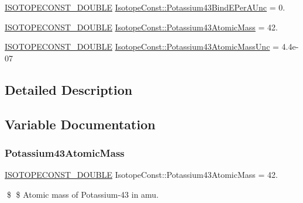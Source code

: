 \begin{DoxyCompactItemize}
\mbox{\hyperlink{group___isotope_const-_macros_ga8f45a7272ce02c0b4c65c44636ed719a}{I\+S\+O\+T\+O\+P\+E\+C\+O\+N\+S\+T\+\_\+\+D\+O\+U\+B\+LE}} \mbox{\hyperlink{group___isotope_const-_potassium-_k43_ga73a98276c2fe726e65bc5e60d863a1b0}{Isotope\+Const\+::\+Potassium43\+Bind\+E\+Per\+A\+Unc}} = 0.
\item 
\mbox{\hyperlink{group___isotope_const-_macros_ga8f45a7272ce02c0b4c65c44636ed719a}{I\+S\+O\+T\+O\+P\+E\+C\+O\+N\+S\+T\+\_\+\+D\+O\+U\+B\+LE}} \mbox{\hyperlink{group___isotope_const-_potassium-_k43_gae10022332c7449786de3f9a935e74e0f}{Isotope\+Const\+::\+Potassium43\+Atomic\+Mass}} = 42.
\item 
\mbox{\hyperlink{group___isotope_const-_macros_ga8f45a7272ce02c0b4c65c44636ed719a}{I\+S\+O\+T\+O\+P\+E\+C\+O\+N\+S\+T\+\_\+\+D\+O\+U\+B\+LE}} \mbox{\hyperlink{group___isotope_const-_potassium-_k43_gaa1a14490136017d0ffdbdfaaef9ca283}{Isotope\+Const\+::\+Potassium43\+Atomic\+Mass\+Unc}} = 4.\+4e-\/07
\end{DoxyCompactItemize}


\subsection{Detailed Description}


\subsection{Variable Documentation}
\mbox{\label{group___isotope_const-_potassium-_k43_gae10022332c7449786de3f9a935e74e0f}} 
\subsubsection{\texorpdfstring{Potassium43\+Atomic\+Mass}{Potassium43AtomicMass}}
{\footnotesize\ttfamily \mbox{\hyperlink{group___isotope_const-_macros_ga8f45a7272ce02c0b4c65c44636ed719a}{I\+S\+O\+T\+O\+P\+E\+C\+O\+N\+S\+T\+\_\+\+D\+O\+U\+B\+LE}} Isotope\+Const\+::\+Potassium43\+Atomic\+Mass = 42.}

\$ \$ Atomic mass of Potassium-\/43 in amu. \mbox{\label{group___isotope_const-_potassium-_k43_gaa1a14490136017d0ffdbdfaaef9ca283}} 
